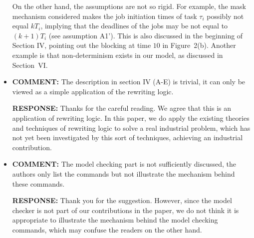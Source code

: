 \documentclass[10pt,journal]{IEEEtran}
\newcommand{\hide}[1]{\ignorespaces}
\newcommand{\ANSWER}{{\bf RESPONSE: }}
\newcommand{\COMMENT}{{\bf COMMENT: }}
\begin{document}
\begin{itemize}
On the other hand, the assumptions are not so rigid. For example, the
mask mechanism considered makes the job initiation times of task
$\tau_i$ possibly not equal $kT_i$, implying that the deadlines of the
jobs may be not equal to $(k+1)T_i$ (see assumption A1'). This is also
discussed in the beginning of Section IV, pointing out the blocking at
time $10$ in Figure~2(b). Another example is that non-determinism
exists in our model, as discussed in Section~VI.

\item
\COMMENT The description in section IV (A-E) is trivial, it can only
be viewed as a simple application of the rewriting logic.

\ANSWER Thanks for the careful reading. We agree that this is an
application of rewriting logic. In this paper, we do apply the
existing theories and techniques of rewriting logic to solve a real
industrial problem, which has not yet been investigated by this sort
of techniques, achieving an industrial contribution.

\item
\COMMENT The model checking part is not sufficiently discussed, the
authors only list the commands but not illustrate the mechanism behind
these commands.

\ANSWER Thank you for the suggestion. However, since the model checker
is not part of our contributions in the paper, we do not think it is
appropriate to illustrate the mechanism behind the model checking
commands, which may confuse the readers on the other hand.

\end{itemize}

\hide{
\ifCLASSOPTIONcompsoc
  \section*{Acknowledgments}
\else
  \section*{Acknowledgment}
\fi

The authors would like to thank...
}

\ifCLASSOPTIONcaptionsoff
  \newpage
\fi
\end{document}
